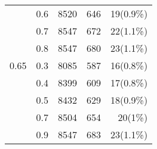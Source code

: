 \begin{center}
\begin{longtable}{llrrr}
                      & 0.6   & 8520 & 646 & 19(0.9\%) \\
                      & 0.7   & 8547 & 672 & 22(1.1\%) \\
                      & 0.8   & 8547 & 680 & 23(1.1\%) \\ \hline
                    0.65 & 0.3   & 8085 & 587 & 16(0.8\%) \\
                      & 0.4   & 8399 & 609 & 17(0.8\%) \\
                      & 0.5   & 8432 & 629 & 18(0.9\%) \\
                      & 0.7   & 8504 & 654 & 20(1\%)   \\
                      & 0.9   & 8547 & 683 & 23(1.1\%)
\end{longtable}
\end{center}
